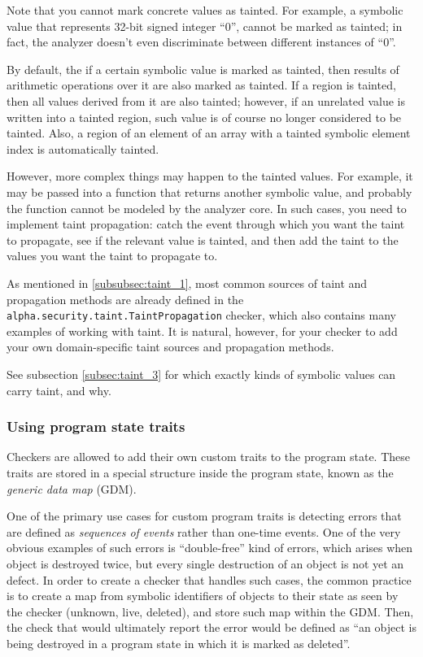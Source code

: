 \documentclass[a4paper,12pt]{article}
\begin{document}
Note that you cannot mark concrete values as tainted. For example, a symbolic value that represents 32-bit signed integer ``$0$'', cannot be marked as tainted; in fact, the analyzer doesn't even discriminate between different instances of ``$0$''.

By default, the if a certain symbolic value is marked as tainted, then results of arithmetic operations over it are also marked as tainted. If a region is tainted, then all values derived from it are also tainted; however, if an unrelated value is written into a tainted region, such value is of course no longer considered to be tainted. Also, a region of an element of an array with a tainted symbolic element index is automatically tainted.

However, more complex things may happen to the tainted values. For example, it may be passed into a function that returns another symbolic value, and probably the function cannot be modeled by the analyzer core. In such cases, you need to implement taint propagation: catch the event through which you want the taint to propagate, see if the relevant value is tainted, and then add the taint to the values you want the taint to propagate to.

As mentioned in \ref{subsubsec:taint_1}, most common sources of taint and propagation methods are already defined in the \lstinline|alpha.security.taint.TaintPropagation| checker, which also contains many examples of working with taint. It is natural, however, for your checker to add your own domain-specific taint sources and propagation methods.

See subsection \ref{subsec:taint_3} for which exactly kinds of symbolic values can carry taint, and why.

\subsubsection{Using program state traits}\label{subsubsec:gdm}

Checkers are allowed to add their own custom traits to the program state. These traits are stored in a special structure inside the program state, known as the \emph{generic data map} (GDM).

One of the primary use cases for custom program traits is detecting errors that are defined as \emph{sequences of events} rather than one-time events. One of the very obvious examples of such errors is ``double-free'' kind of errors, which arises when object is destroyed twice, but every single destruction of an object is not yet an defect. In order to create a checker that handles such cases, the common practice is to create a map from symbolic identifiers of objects to their state as seen by the checker (unknown, live, deleted), and store such map within the GDM. Then, the check that would ultimately report the error would be defined as ``an object is being destroyed in a program state in which it is marked as deleted''.
\end{document}
